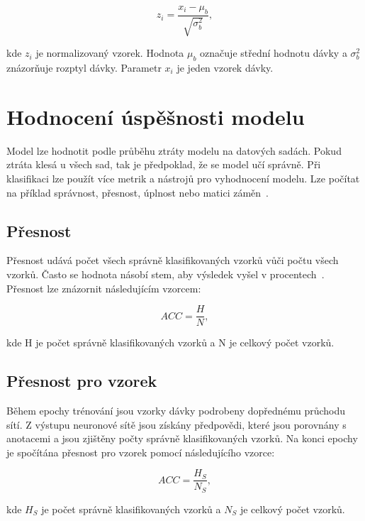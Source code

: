 \documentclass[FM,BP]{tulthesis}
\begin{document}
\begin{equation}
\label{eqn:batch_mean}
z_i = \frac{x_i - \mu_b}{\sqrt{\sigma^2_b}},
\end{equation}

kde $ z_i $ je normalizovaný vzorek. Hodnota $ \mu_b $ označuje střední hodnotu dávky a $ \sigma^2_b $ znázorňuje rozptyl dávky. Parametr $ x_i $ je jeden vzorek dávky.

\section{Hodnocení úspěšnosti modelu} %
Model lze hodnotit podle průběhu ztráty modelu na datových sadách. Pokud ztráta klesá u všech sad, tak je předpoklad, že se model učí správně. Při klasifikaci lze použít více metrik a nástrojů pro vyhodnocení modelu. Lze počítat na příklad správnost, přesnost, úplnost nebo matici záměn~\cite{burkov2019hundred}.

\subsection{Přesnost} %
Přesnost udává počet všech správně klasifikovaných vzorků vůči počtu všech vzorků. Často se hodnota násobí stem, aby výsledek vyšel v procentech~\cite{burkov2019hundred}. Přesnost lze znázornit následujícím vzorcem:

\begin{equation}
\label{eqn:accuracy}
ACC = \frac{H}{N},
\end{equation}

kde H je počet správně klasifikovaných vzorků a N je celkový počet vzorků.

\subsection{Přesnost pro vzorek}
Během epochy trénování jsou vzorky dávky podrobeny dopřednému průchodu sítí. Z výstupu neuronové sítě jsou získány předpovědi, které jsou porovnány s anotacemi a jsou zjištěny počty správně klasifikovaných vzorků. Na konci epochy je spočítána přesnost pro vzorek pomocí následujícího vzorce:

\begin{equation}
\label{eqn:accuracy}
ACC = \frac{H_S}{N_S},
\end{equation}

kde $ H_S $ je počet správně klasifikovaných vzorků a $ N_S $ je celkový počet vzorků.
\end{document}
